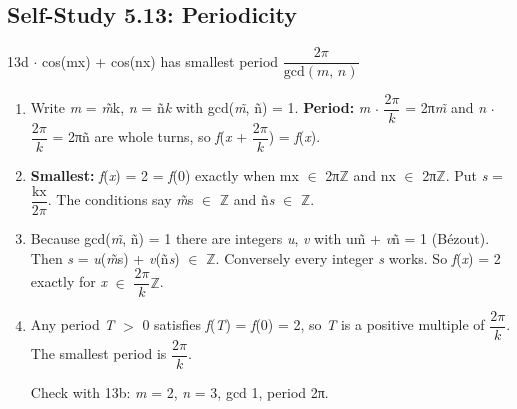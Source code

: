 \documentclass[11pt]{article}
\begin{document}
\begin{keepsection}\subsection{Self-Study 5.13: Periodicity}

\begin{workedbox}{13d \ensuremath{\cdot} cos(mx) + cos(nx) has smallest period {\small\ensuremath{\dfrac{2π}{\text{gcd}({m},\, {n})}}}}
\begin{enumerate}
\item Write \textit{m} = \textit{m}̃k, \textit{n} = ñ\textit{k} with gcd(\textit{m̃}, ñ) = 1. \textbf{Period:} \textit{m} \ensuremath{\cdot} {\small\ensuremath{\dfrac{2π}{{k}}}} = 2π\textit{m̃} and \textit{n} \ensuremath{\cdot} {\small\ensuremath{\dfrac{2π}{{k}}}} = 2πñ are whole turns, so \textit{f}(\textit{x} + {\small\ensuremath{\dfrac{2π}{{k}}}}) = \textit{f}(\textit{x}).
\item \textbf{Smallest:} \textit{f}(\textit{x}) = 2 = \textit{f}(0) exactly when mx \ensuremath{\in} 2π\ensuremath{\mathbb{Z}} and nx \ensuremath{\in} 2π\ensuremath{\mathbb{Z}}. Put \textit{s} = {\small\ensuremath{\dfrac{\text{kx}}{2π}}}. The conditions say \textit{m}̃s \ensuremath{\in} \ensuremath{\mathbb{Z}} and ñ\textit{s} \ensuremath{\in} \ensuremath{\mathbb{Z}}.
\item Because gcd(\textit{m̃}, ñ) = 1 there are integers \textit{u}, \textit{v} with um̃ + \textit{v}ñ = 1 (Bézout). Then \textit{s} = \textit{u}(\textit{m}̃s) + \textit{v}(ñ\textit{s}) \ensuremath{\in} \ensuremath{\mathbb{Z}}. Conversely every integer \textit{s} works. So \textit{f}(\textit{x}) = 2 exactly for \textit{x} \ensuremath{\in} {\small\ensuremath{\dfrac{2π}{{k}}}}\ensuremath{\mathbb{Z}}.
\item {}
Any period \textit{T} \ensuremath{>} 0 satisfies \textit{f}(\textit{T}) = \textit{f}(0) = 2, so \textit{T} is a positive multiple of {\small\ensuremath{\dfrac{2π}{{k}}}}. The smallest period is {\small\ensuremath{\dfrac{2π}{{k}}}}.

Check with 13b: \textit{m} = 2, \textit{n} = 3, gcd 1, period 2π.
\end{enumerate}
\end{workedbox}

\end{keepsection}
\end{document}
